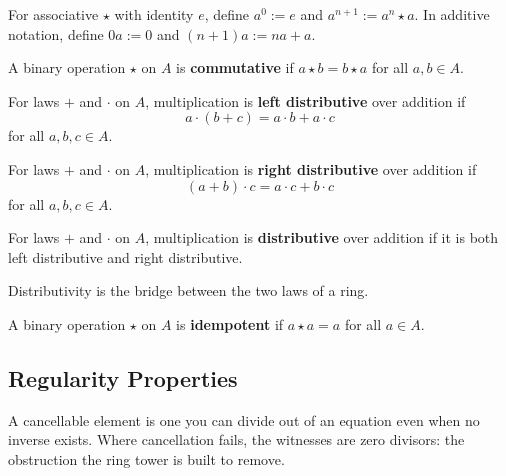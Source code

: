\begin{definition}
\label{def:powers}
For associative $\star$ with identity $e$, define $a^0:=e$ and
$a^{n+1}:=a^n\star a$. In additive notation, define $0a:=0$ and
$(n+1)a:=na+a$.
\end{definition}

\begin{definition}[Commutativity]
\label{def:comm}
A binary operation $\star$ on $A$ is \textbf{commutative} if
$a\star b=b\star a$ for all $a,b\in A$.
\end{definition}

\begin{definition}
\label{def:left-distrib}
For laws $+$ and $\cdot$ on $A$, multiplication is \textbf{left
distributive} over addition if
\[
  a\cdot(b+c)=a\cdot b+a\cdot c
\]
for all $a,b,c\in A$.
\end{definition}

\begin{definition}
\label{def:right-distrib}
For laws $+$ and $\cdot$ on $A$, multiplication is \textbf{right
distributive} over addition if
\[
  (a+b)\cdot c=a\cdot c+b\cdot c
\]
for all $a,b,c\in A$.
\end{definition}

\begin{definition}[Distributivity]
\label{def:distrib}
For laws $+$ and $\cdot$ on $A$, multiplication is \textbf{distributive}
over addition if it is both left distributive and right distributive.
\end{definition}

\begin{remark*}[Interpretation]
Distributivity is the bridge between the two laws of a ring.
\end{remark*}

\begin{definition}
\label{def:idempotent}
A binary operation $\star$ on $A$ is \textbf{idempotent} if
$a\star a=a$ for all $a\in A$.
\end{definition}

\subsection{Regularity Properties}
\label{sec:regularity-properties}

\begin{remark*}
A cancellable element is one you can divide out of an equation even when no
inverse exists. Where cancellation fails, the witnesses are zero divisors:
the obstruction the ring tower is built to remove.
\end{remark*}

